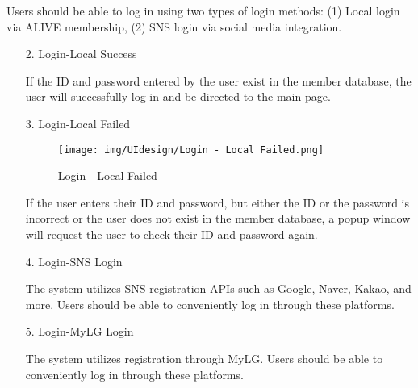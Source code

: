 \documentclass[conference]{IEEEtran}
\begin{document}
\begin{enumerate}
\begin{itemize}
\begin{itemize}
\begin{enumerate}
\begin{enumerate}
    Users should be able to log in using two types of login methods: (1) Local login via ALIVE membership, (2) SNS login via social media integration. \\ 
\end{enumerate}

\begin{enumerate}
    \item[2.] Login-Local Success

    If the ID and password entered by the user exist in the member database, the user will successfully log in and be directed to the main page. \\
\end{enumerate}

\begin{enumerate}
    \item[3.] Login-Local Failed
    \begin{figure}[h]
        {\centering
        \hspace{4cm}
        \begin{minipage}{0.4\columnwidth}
            \texttt{[image: img/UIdesign/Login - Local Failed.png]}
            \caption{Login - Local Failed}
        \end{minipage}}
    \end{figure}
    
    If the user enters their ID and password, but either the ID or the password is incorrect or the user does not exist in the member database, a popup window will request the user to check their ID and password again. \\ 
\end{enumerate}

\begin{enumerate}
    \item[4.] Login-SNS Login
    
    The system utilizes SNS registration APIs such as Google, Naver, Kakao, and more. Users should be able to conveniently log in through these platforms. \\ 
\end{enumerate}

\begin{enumerate}
    \item[5.] Login-MyLG Login
    
    The system utilizes registration through MyLG. Users should be able to conveniently log in through these platforms. \\ 
\end{enumerate}


\end{enumerate}
\end{itemize}
\end{itemize}
\end{enumerate}
\end{document}
